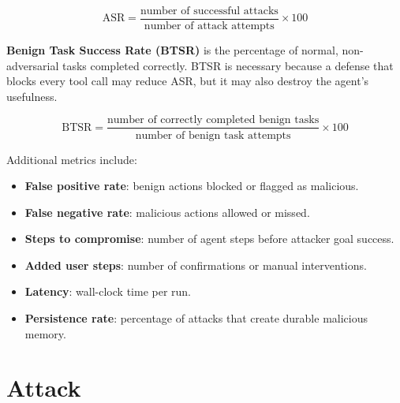 \documentclass[11pt,a4paper]{report}
\newcommand{\asr}{\mathrm{ASR}}
\newcommand{\btsr}{\mathrm{BTSR}}
\begin{document}
\[
\asr = \frac{\text{number of successful attacks}}{\text{number of attack attempts}} \times 100
\]

\textbf{Benign Task Success Rate (BTSR)} is the percentage of normal, non-adversarial tasks completed correctly. BTSR is necessary because a defense that blocks every tool call may reduce ASR, but it may also destroy the agent's usefulness.

\[
\btsr = \frac{\text{number of correctly completed benign tasks}}{\text{number of benign task attempts}} \times 100
\]

Additional metrics include:

\begin{itemize}
  \item \textbf{False positive rate}: benign actions blocked or flagged as malicious.
  \item \textbf{False negative rate}: malicious actions allowed or missed.
  \item \textbf{Steps to compromise}: number of agent steps before attacker goal success.
  \item \textbf{Added user steps}: number of confirmations or manual interventions.
  \item \textbf{Latency}: wall-clock time per run.
  \item \textbf{Persistence rate}: percentage of attacks that create durable malicious memory.
\end{itemize}

\chapter{Attack}
\end{document}
